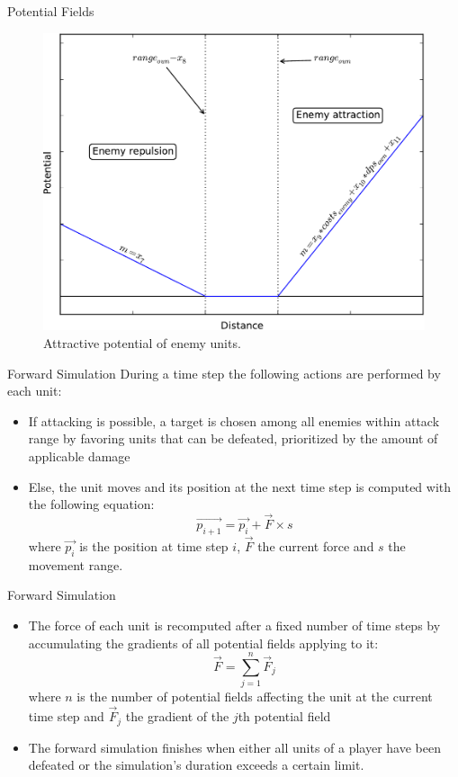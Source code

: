 \documentclass{beamer}
\begin{document}
\begin{frame}{Potential Fields}
\begin{center}
\begin{figure}[h]
	\includegraphics[width=0.5\linewidth]{enemy2-crop.pdf}
	\caption{Attractive potential of enemy units.}
	\label{fig:graph_enemy2}
\end{figure}
\end{center}
\end{frame}
\begin{frame}{Forward Simulation}
During a time step the following actions are performed by each unit:
\begin{itemize}
\item If \alert{attacking} is possible, a target is chosen among all enemies within attack range by favoring units that can be defeated, prioritized by the amount of applicable damage
\item Else, the unit \alert{moves} and its position at the next time step is computed with the following equation:
	\begin{equation*}
		\vec{p_{i+1}} = \vec{p_i} +\vec{F} \times s
	\end{equation*}
	where $\vec{p_i}$ is the position at time step $i$, $\vec{F}$ the current force and $s$ the movement range. 
\end{itemize}
\end{frame}

\begin{frame}{Forward Simulation}
\begin{itemize}
\item The \alert{force} of each unit is recomputed after a fixed number of time steps by accumulating the gradients of all potential fields applying to it:
	\begin{equation*}
		\vec{F} = \sum_{j=1}^n \vec{F}_j
	\end{equation*}
	where $n$ is the number of potential fields affecting the unit at the current time step and $\vec{F}_j$ the gradient of the $j$th potential field
\item The forward simulation finishes when either all units of a player have been defeated or the simulation’s duration exceeds a certain limit.
\end{itemize}
\end{frame}
\end{document}
